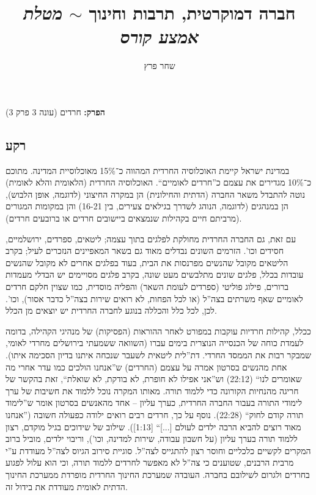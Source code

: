 \documentclass[]{../../../../tex/classes/styledArticle}
\author{שחר פרץ}
\title{חברה דמוקרטית, תרבות וחינוך $\sim$ \textit{מטלת אמצע קורס}}
\begin{document}
	\maketitle
	
	\textbf{הפרק: }חרדים (עונה 3 פרק 3)
	
	\subsection*{רקע}
	
	במדינת ישראל קיימת האוכלוסיה החרדית המהווה כ־15\% מאוכלוסיית המדינה. מתוכם כ־10\% מגדירים את עצמם כ''חרדים לאומיים``. האוכלוסיה החרדית (הלאומית והלא לאומית) נוטה להתבדל משאר החברה (הדתית והחילונית) הן במקרה החיצוני (לדוגמה, אופן הלבוש), הן במנהגים (לדוגמה, הנוהג לשדרך בגילאים צעירים, בין 16-21) והן במקומות המגורים (מרביתם חיים בקהילות שנמצאים ביישובים חרדים או ברובעים חרדים). 
	
	עם זאת, גם החברה החרדית מחולקת לפלגים בתוך עצמה; ליטאים, ספרדים, ירושלמיים, חסידים וכו'. הזרמים השונים נבדלים מאוד גם בשאר המאפיינים הנזכרים לעיל; בקרב הליטאים מקובל שהנשים מפרנסות את הבית, בעוד בפלגים אחרים לא מקובל שהנשים עובדות בכלל, פלגים שונים מתלבשים מעט שונה, בקרב פלגים מסויימים יש הבדלי מעמדות ברורים, פילוג פוליטי (ספרדים לעומת השאר) והפליה מוסדית, כמו שצוין חלקם חרדים לאומיים שאף משרתים בצה''ל (או לכל הפחות, לא רואים שירות בצה''ל כדבר אסור), וכו'. לכן, לכל כלל והכללה בנוגע לחברה החרדית יש יוצאים מן הכלל. 
	
	ככלל, קהילות חרדיות עוקבות במפורט לאחר ההוראות (הפסיקות) של מנהיגי הקהילה, בדומה לעמדת כוחה של הכנסייה הנוצרית בימים עברו (השוואה ששמעתי בירושלים מחרדי לאומי, שמבקר רבות את הממסד החרדי. דת''לית ליטאית לשעבר שנכחה איתנו בדיון הסכימה איתו). אחת מהנשים בסרטון אמרה על עצמם (החרדים) ש''אנחנו הולכים כמו עדר אחרי מה שאומרים לנו`` (22:12) וש''אני אפילו לא חופרת, לא בודקת, לא שואלת``, זאת בהקשר של חריגה מהנחיות הקורונה כדי ללמוד תורה. מאותו המקרה נוכל ללמוד את חשיבות של ערך לימודי התורה בעבור החברה החרדית, כערך עליון – אחד מהאנשים בסרטון אומר ש''לימוד תורה קודם לחוק`` (22:28). נוסף על כך, חרדים רבים רואים ילודה כפעולה חשובה (''אנחנו מאוד רוצים להביא הרבה ילדים לעולם [...]`` [1:13]). שילוב של שידוכים בגיל מוקדם, רצון ללמוד תורה בערך עליון (על חשבון עבודה, שירות למדינה, וכו'), וריבוי ילדים, מוביל ברוב המקרים לקשיים כלכליים וחוסר רצון להתגייס לצה''ל. סוגיית סירוב הגיוס לצה''ל מעודדת ע''י מרבית הרבנים, שטוענים כי צה''ל לא מאפשר לחרדים ללמוד תורה, וכי הוא עלול לפגוע בחרדים ולגרום לשילובם בחברה. העובדה שמערכת החינוך החרדית מופרדת ממערכת החינוך הדתית לאומית מעודדת את בידול זה. 
	
\end{document}
